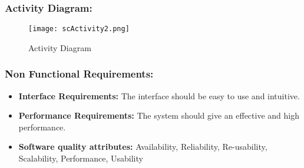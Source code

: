 \documentclass[10pt,a4paper]
{article}
\numberwithin{table}{section}
\begin{document}
{{\begin{normalsize}
\subsubsection{Activity Diagram:}  


\begin{center}
	  \begin{figure}[h]
			\centering
			\texttt{[image: scActivity2.png]}
			\caption{Activity Diagram}
		\end{figure}
	\end{center}



\newpage
\subsubsection{Non Functional Requirements:}
\begin{itemize}
	\item	\textbf{Interface Requirements: } The interface should be easy to use and intuitive.
	\item	\textbf{Performance Requirements: } The system should give an effective and high performance.
    \item	\textbf{Software quality attributes: } Availability, Reliability, Re-usability, Scalability, Performance, Usability
    

\end{itemize}
\end{normalsize}}}
\end{document}
